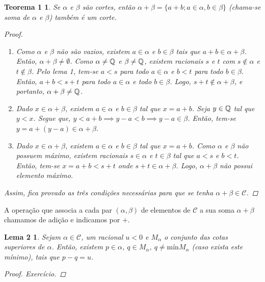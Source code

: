 \documentclass[a4paper,12pt]{article}
\newtheorem*{t1}{Teorema 1}
\newtheorem*{l2}{Lema 2}
\begin{document}
	\begin{t1}
		
		Se $\alpha$ e $\beta$ são cortes, então $\alpha + \beta = \{a+b; a \in \alpha, b \in \beta\}$ (chama-se soma de $\alpha$ e $\beta$) também é um corte.
		
		\begin{proof}
			
			\begin{enumerate}
				
				\item Como $\alpha$ e $\beta$ não são vazios, existem $a \in \alpha$ e $b \in \beta$ tais que $a+b \in \alpha + \beta$. Então, $\alpha + \beta \neq \emptyset$. Como $\alpha \neq \Bbb Q$ e $\beta \neq \Bbb Q$, existem racionais $s$ e $t$ com $s \notin \alpha$ e $t \notin \beta$. Pelo lema 1, tem-se $a < s$ para todo $a \in \alpha$ e $b < t$ para todo $b \in \beta$. Então, $a+b < s+t$ para todo $a \in \alpha$ e todo $b \in \beta$. Logo, $s+t \notin \alpha + \beta$, e portanto, $\alpha + \beta \neq \Bbb Q$.
				
				\item Dado $x \in \alpha + \beta$, existem $a \in \alpha$ e $b \in \beta$ tal que $x = a + b$. Seja $y \in \Bbb Q$ tal que $y < x$. Segue que, $y < a + b \implies y - a < b \implies y -a \in \beta$. Então, tem-se $y = a + (y - a) \in \alpha + \beta$.
				
				\item Dado $x \in \alpha + \beta$, existem $a \in \alpha$ e $b \in \beta$ tal que $x = a + b$. Como $\alpha$ e $\beta$ não possuem máximo, existem racionais $s \in \alpha$ e $t \in \beta$ tal que $a < s$ e $b < t$. Então, tem-se $x = a + b < s + t$ onde $s + t \in \alpha + \beta$. Logo, $\alpha + \beta$ não possui elemento máximo.
				
			\end{enumerate}
		
		Assim, fica provado as três condições necessárias para que se tenha $\alpha + \beta \in \mathcal C$.
			
		\end{proof}
		
	\end{t1}


A operação que associa a cada par $(\alpha, \beta)$ de elementos de $\mathcal C$ a sua soma $\alpha + \beta$ chamamos de adição e indicamos por $+$.

	\begin{l2}
		
		Sejam $\alpha \in \mathcal C$, um racional $u < 0$ e $M_{\alpha}$ o conjunto das cotas superiores de $\alpha$. Então, existem $p \in \alpha$, $q \in M_{\alpha}$, $q \neq \text{mín}M_{\alpha}$ (caso exista este mínimo), tais que $p - q = u$.
		
		\begin{proof}
			Exercício.
		\end{proof}
		
	\end{l2}
\end{document}
